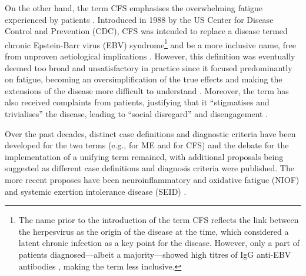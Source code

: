 On the other hand, the term CFS emphasises the overwhelming fatigue experienced by patients \citep{wojcik2011ChronicFatigue}. Introduced in 1988 by the US Center for Disease Control and Prevention (CDC), CFS was intended to replace a disease termed chronic Epstein-Barr virus (EBV) syndrome\footnote{The name prior to the introduction of the term CFS reflects the link between the herpesvirus as the origin of the disease at the time, which considered a latent chronic infection as a key point for the disease. However, only a part of patients diagnosed---albeit a majority---showed high titres of IgG anti-EBV antibodies \citep{horwitz1985LongtermSerological}, making the term less inclusive.} and be a more inclusive name, free from unproven aetiological implications \citep{holmes1988ChronicFatigue}. However, this definition was eventually deemed too broad and unsatisfactory in practice since it focused predominantly on fatigue, becoming an oversimplification of the true effects and making the extensions of the disease more difficult to understand \citep{noor2021ComprehensiveUpdate}. Moreover, the term has also received complaints from patients, justifying that it ``stigmatises and trivialises'' the disease, leading to ``social disregard'' and disengagement \citep{instituteofmedicine2015MyalgicEncephalomyelitis}.

Over the past decades, distinct case definitions and diagnostic criteria have been developed for the two terms (e.g., \citet{hyde2007NightingaleMylagic, carruthers2011MyalgicEncephalomyelitis} for ME and \citet{holmes1988ChronicFatigue, sharpe1991ReportChronic, fukuda1994ChronicFatigue} for CFS) and the debate for the implementation of a unifying term remained, with additional proposals being suggested as different case definitions and diagnosis criteria were published. The more recent proposes have been neuroinflammatory and oxidative fatigue (NIOF) \citep{maes2015NewCase} and systemic exertion intolerance disease (SEID) \citep{instituteofmedicine2015MyalgicEncephalomyelitis}.

